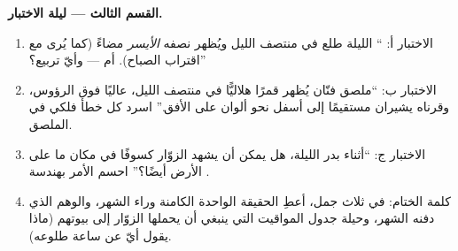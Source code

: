 \begin{problem}
\medskip\noindent\textbf{القسم الثالث --- ليلة الاختبار.}
\begin{enumerate}[resume]
  \item {} الاختبار أ: `` الليلة طلع في منتصف الليل
        ويُظهر نصفه \emph{الأيسر} مضاءً (كما يُرى مع اقتراب
        الصباح).  أم  --- وأيّ تربيع؟''
  \item {} الاختبار ب: ``ملصق فنّان يُظهر قمرًا هلاليًّا في
        منتصف الليل، عاليًا فوق الرؤوس، وقرناه يشيران مستقيمًا
        إلى أسفل نحو ألوان  على الأفق.'' اسرد كل خطأ
        فلكي في الملصق.
  \item {} الاختبار ج: ``أثناء بدر الليلة، هل يمكن أن يشهد
        الزوّار كسوفًا في مكان ما على الأرض أيضًا؟'' احسم
        الأمر بهندسة .
  \item كلمة الختام: في ثلاث جمل، أعطِ الحقيقة الواحدة الكامنة
        وراء الشهر، والوهم الذي دفنه الشهر، وحيلة جدول
        المواقيت التي ينبغي أن يحملها الزوّار إلى بيوتهم (ماذا
        يقول أيّ  عن ساعة طلوعه).
\end{enumerate}
\end{problem}
